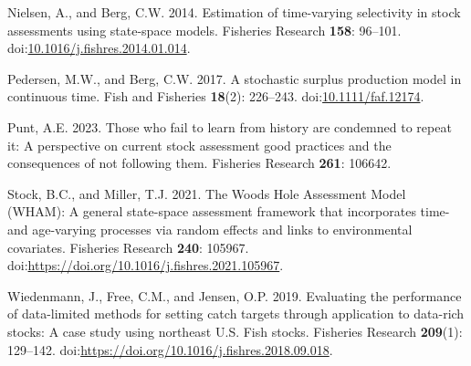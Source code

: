 \documentclass[
  12pt,
]{article}
\newlength{\cslhangindent}
\newlength{\cslentryspacingunit} %
\newenvironment{CSLReferences}[2] %
 {%
  \setlength{\parindent}{0pt}
  \ifodd #1
  \let\oldpar\par
  \def\par{\hangindent=\cslhangindent\oldpar}
  \fi
  \setlength{\parskip}{#2\cslentryspacingunit}
 }%
 {}
\begin{document}
\begin{CSLReferences}{1}{0}
\leavevmode{}%
Nielsen, A., and Berg, C.W. 2014. Estimation of time-varying selectivity
in stock assessments using state-space models. Fisheries Research
\textbf{158}: 96--101.
doi:\href{https://doi.org/10.1016/j.fishres.2014.01.014}{10.1016/j.fishres.2014.01.014}.

\leavevmode{}%
Pedersen, M.W., and Berg, C.W. 2017. A stochastic surplus production
model in continuous time. Fish and Fisheries \textbf{18}(2): 226--243.
doi:\href{https://doi.org/10.1111/faf.12174}{10.1111/faf.12174}.

\leavevmode{}%
Punt, A.E. 2023. Those who fail to learn from history are condemned to
repeat it: A perspective on current stock assessment good practices and
the consequences of not following them. Fisheries Research \textbf{261}:
106642.

\leavevmode{}%
Stock, B.C., and Miller, T.J. 2021. The {W}oods {H}ole {A}ssessment
{M}odel ({WHAM}): {A} general state-space assessment framework that
incorporates time- and age-varying processes via random effects and
links to environmental covariates. Fisheries Research \textbf{240}:
105967. doi:\url{https://doi.org/10.1016/j.fishres.2021.105967}.

\leavevmode{}%
Wiedenmann, J., Free, C.M., and Jensen, O.P. 2019. Evaluating the
performance of data-limited methods for setting catch targets through
application to data-rich stocks: A case study using northeast {U.S.}
Fish stocks. Fisheries Research \textbf{209}(1): 129--142.
doi:\url{https://doi.org/10.1016/j.fishres.2018.09.018}.

\end{CSLReferences}

\pagebreak

\clearpage
\end{document}
